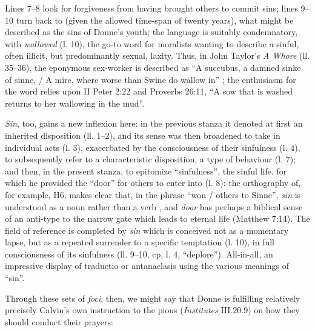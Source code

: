 \begin{paper}
Lines 7--8 look for forgiveness from having brought others to commit
sins; lines 9--10 turn back to (given the allowed time-span of twenty
years), what might be described as the sins of Donne's youth; the
language is suitably condemnatory, with \emph{wallowed} (l. 10), the
go-to word for moralists wanting to describe a sinful, often illicit,
but predominantly sexual, laxity. Thus, in John Taylor's \emph{A
Whore} (ll. 35--36), the eponymous sex-worker is described as ``A
succubus, a damned sinke of sinne, / A mire, where worse than Swine do
wallow in'' \citep[106]{taylor_all_1630}; the enthusiasm for the word relies upon
II Peter 2:22 and Proverbs 26:11, ``A sow that is washed returns to
her wallowing in the mud''.

\emph{Sin}, too, gains a new inflexion here: in the previous stanza it
denoted at first an inherited disposition (ll. 1--2), and its sense was
then broadened to take in individual acts (l. 3), exacerbated by the
consciousness of their sinfulness (l. 4), to subsequently refer to a
characteristic disposition, a type of behaviour (l. 7); and then, in the
present stanza, to epitomize ``sinfulness'', the sinful life, for which
he provided the ``door'' for others to enter into (l. 8): the
orthography of, for example, H6, makes clear that, in the phrase
``won / others to Sinne'', \emph{sin} is understood as a noun rather than
a verb \citep[see][20]{pebworth_editor_1987}, and \emph{door} has perhaps a biblical
sense of an anti-type to the narrow gate which leads to eternal life
(Matthew 7:14). The field of reference is completed by \emph{sin} which
is conceived not as a momentary lapse, but as a repeated surrender to a
specific temptation (l. 10), in full consciousness of its sinfulness
(ll. 9--10, cp. l. 4, ``deplore''). All-in-all, an impressive display of
traductio or antanaclasis using the various meanings of ``sin''.

Through these sets of \emph{foci}, then, we might say that Donne is
fulfilling relatively precisely Calvin's own instruction to the pious
(\emph{Institutes} III.20.9) on how they should conduct their prayers:


\end{paper}

